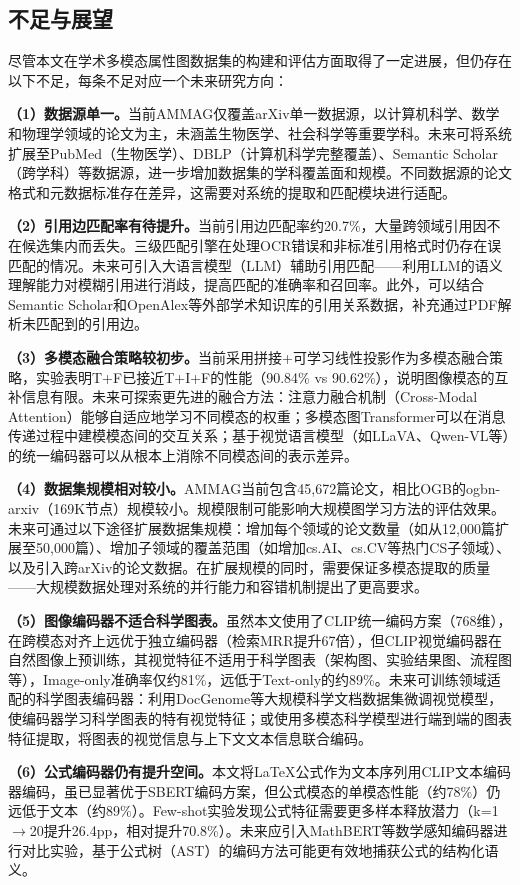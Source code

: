 \begin{conclusion}
\section{不足与展望}

尽管本文在学术多模态属性图数据集的构建和评估方面取得了一定进展，但仍存在以下不足，每条不足对应一个未来研究方向：

\textbf{（1）数据源单一。}当前AMMAG仅覆盖arXiv单一数据源，以计算机科学、数学和物理学领域的论文为主，未涵盖生物医学、社会科学等重要学科。未来可将系统扩展至PubMed\cite{lo2020s2orc}（生物医学）、DBLP（计算机科学完整覆盖）、Semantic Scholar（跨学科）等数据源，进一步增加数据集的学科覆盖面和规模。不同数据源的论文格式和元数据标准存在差异，这需要对系统的提取和匹配模块进行适配。

\textbf{（2）引用边匹配率有待提升。}当前引用边匹配率约20.7\%，大量跨领域引用因不在候选集内而丢失。三级匹配引擎在处理OCR错误和非标准引用格式时仍存在误匹配的情况。未来可引入大语言模型（LLM）辅助引用匹配——利用LLM的语义理解能力对模糊引用进行消歧，提高匹配的准确率和召回率。此外，可以结合Semantic Scholar\cite{lo2020s2orc}和OpenAlex\cite{priem2022openalex}等外部学术知识库的引用关系数据，补充通过PDF解析未匹配到的引用边。

\textbf{（3）多模态融合策略较初步。}当前采用拼接+可学习线性投影作为多模态融合策略，实验表明T+F已接近T+I+F的性能（90.84\% vs 90.62\%），说明图像模态的互补信息有限。未来可探索更先进的融合方法：注意力融合机制（Cross-Modal Attention）能够自适应地学习不同模态的权重；多模态图Transformer可以在消息传递过程中建模模态间的交互关系；基于视觉语言模型（如LLaVA、Qwen-VL等）的统一编码器可以从根本上消除不同模态间的表示差异。

\textbf{（4）数据集规模相对较小。}AMMAG当前包含45,672篇论文，相比OGB的ogbn-arxiv（169K节点）规模较小。规模限制可能影响大规模图学习方法的评估效果。未来可通过以下途径扩展数据集规模：增加每个领域的论文数量（如从12,000篇扩展至50,000篇）、增加子领域的覆盖范围（如增加cs.AI、cs.CV等热门CS子领域）、以及引入跨arXiv的论文数据。在扩展规模的同时，需要保证多模态提取的质量——大规模数据处理对系统的并行能力和容错机制提出了更高要求。

\textbf{（5）图像编码器不适合科学图表。}虽然本文使用了CLIP统一编码方案（768维），在跨模态对齐上远优于独立编码器（检索MRR提升67倍），但CLIP视觉编码器在自然图像上预训练，其视觉特征不适用于科学图表（架构图、实验结果图、流程图等），Image-only准确率仅约81\%，远低于Text-only的约89\%。未来可训练领域适配的科学图表编码器：利用DocGenome\cite{xia2024docgenome}等大规模科学文档数据集微调视觉模型，使编码器学习科学图表的特有视觉特征；或使用多模态科学模型进行端到端的图表特征提取，将图表的视觉信息与上下文文本信息联合编码。

\textbf{（6）公式编码器仍有提升空间。}本文将LaTeX公式作为文本序列用CLIP文本编码器编码，虽已显著优于SBERT编码方案，但公式模态的单模态性能（约78\%）仍远低于文本（约89\%）。Few-shot实验发现公式特征需要更多样本释放潜力（k=1$\to$20提升26.4pp，相对提升70.8\%）。未来应引入MathBERT等数学感知编码器进行对比实验，基于公式树（AST）的编码方法可能更有效地捕获公式的结构化语义。

\end{conclusion}
